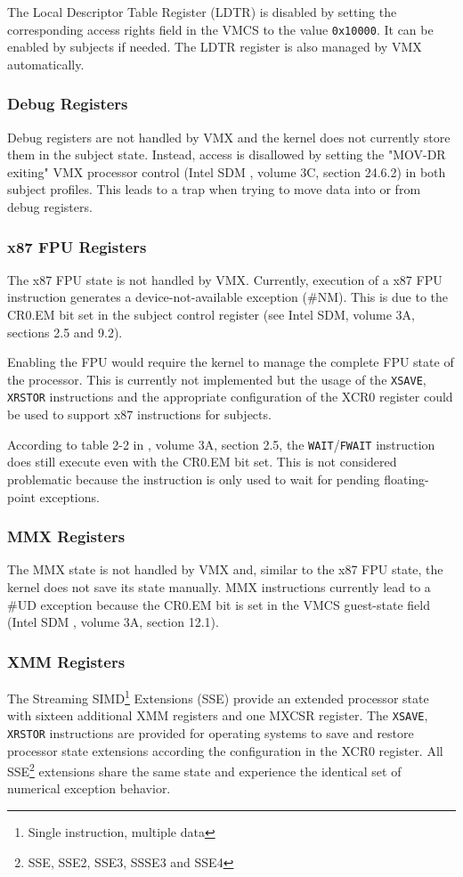 The Local Descriptor Table Register (LDTR) is disabled by setting
the corresponding access rights field in the VMCS to the value \texttt{0x10000}.
It can be enabled by subjects if needed. The LDTR register is also managed by
VMX automatically.

\subsubsection{Debug Registers}
Debug registers are not handled by VMX and the kernel does not currently store
them in the subject state. Instead, access is disallowed by setting the "MOV-DR
exiting" VMX processor control (Intel SDM \cite{IntelSDM}, volume 3C, section
24.6.2) in both subject profiles. This leads to a trap when trying to move data
into or from debug registers.

\subsubsection{x87 FPU Registers}
The x87 FPU state is not handled by VMX. Currently, execution of a x87 FPU
instruction generates a device-not-available exception (\#NM). This is due to
the CR0.EM bit set in the subject control register (see Intel SDM, volume 3A,
sections 2.5 and 9.2).

Enabling the FPU would require the kernel to manage the complete FPU state of
the processor. This is currently not implemented but the usage of the
\texttt{XSAVE}, \texttt{XRSTOR} instructions and the appropriate configuration
of the XCR0 register could be used to support x87 instructions for subjects.

According to table 2-2 in \cite{IntelSDM}, volume 3A, section 2.5, the
\texttt{WAIT}/\texttt{FWAIT} instruction does still execute even with the CR0.EM
bit set. This is not considered problematic because the instruction is only used
to wait for pending floating-point exceptions.

\subsubsection{MMX Registers}
The MMX state is not handled by VMX and, similar to the x87 FPU state, the
kernel does not save its state manually. MMX instructions currently lead to a
\#UD exception because the CR0.EM bit is set in the VMCS guest-state field
(Intel SDM \cite{IntelSDM}, volume 3A, section 12.1).

\subsubsection{XMM Registers}
The Streaming SIMD\footnote{Single instruction, multiple data}
Extensions (SSE) provide an extended processor state with sixteen
additional XMM registers and one MXCSR register. The \texttt{XSAVE},
\texttt{XRSTOR} instructions are provided for operating systems to save and
restore processor state extensions according the configuration in the XCR0
register. All SSE\footnote{SSE, SSE2, SSE3, SSSE3 and SSE4} extensions share
the same state and experience the identical set of numerical exception behavior.

